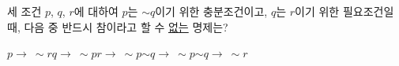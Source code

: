 세 조건 $p$, $q$, $r$에 대하여 $p$는 $\sim q$이기 위한 충분조건이고, $q$는 $r$이기 위한 필요조건일 때, 다음 중 반드시 참이라고 할 수 \underline{없는} 명제는?
\begin{choices32}{$p\longrightarrow\ \sim r$}{$q\longrightarrow\ \sim p$}{$r\longrightarrow\ \sim p$}{$\sim q\longrightarrow\ \sim p$}{$\sim q\longrightarrow\ \sim r$}\end{choices32}
